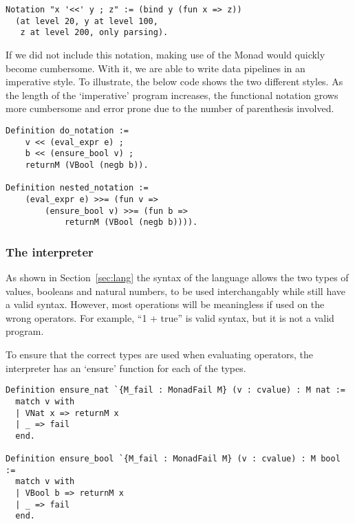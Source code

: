 \begin{listing}
\begin{verbatim}
Notation "x '<<' y ; z" := (bind y (fun x => z))
  (at level 20, y at level 100, 
   z at level 200, only parsing).
\end{verbatim}
\end{listing}

If we did not include this notation, making use of the Monad would quickly
become cumbersome. With it, we are able to write data pipelines in an
imperative style. To illustrate, the below code shows the two
different styles. As the length of the `imperative' program increases, the
functional notation grows more cumbersome and error prone due to the number of
parenthesis involved.

\begin{listing}
\begin{verbatim}
Definition do_notation :=
	v << (eval_expr e) ;
	b << (ensure_bool v) ;
	returnM (VBool (negb b)).

Definition nested_notation :=
	(eval_expr e) >>= (fun v =>
		(ensure_bool v) >>= (fun b =>
			returnM (VBool (negb b)))).
\end{verbatim}
\end{listing}

\subsubsection{The interpreter}
As shown in Section~\ref{sec:lang} the syntax of the language allows the two
types of values, booleans and natural numbers, to be used interchangably while
still have a valid syntax. However, most operations will be meaningless if used
on the wrong operators. For example, ``1 + true'' is valid syntax, but it is 
not a valid program.

To ensure that the correct types are used when evaluating operators,
the interpreter has an `ensure' function for each of the types. 

\begin{listing}
\begin{verbatim}
Definition ensure_nat `{M_fail : MonadFail M} (v : cvalue) : M nat :=
  match v with
  | VNat x => returnM x
  | _ => fail
  end.
            
Definition ensure_bool `{M_fail : MonadFail M} (v : cvalue) : M bool :=
  match v with
  | VBool b => returnM x
  | _ => fail
  end.
\end{verbatim}
\end{listing}

